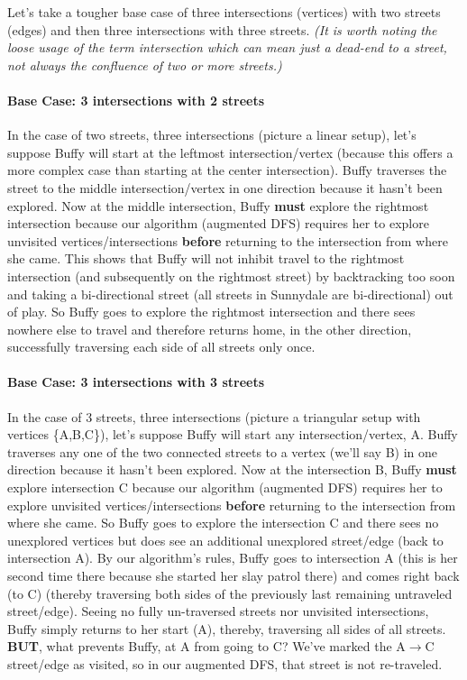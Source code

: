 \documentclass[conference]{styles/acmsiggraph}
\newcommand{\?}{\stackrel{?}{=}}
\newcommand\subsubsubsection{\paragraph}
\begin{document}
Let's take a tougher base case of three intersections (vertices) with two streets (edges) and then three intersections with three streets.  \textit{(It is worth noting the loose usage of the term intersection which can mean just a dead-end to a street, not always the confluence of two or more streets.)}  

\subsubsubsection{Base Case: 3 intersections with 2 streets} In the case of two streets, three intersections (picture a linear setup), let's suppose Buffy will start at the leftmost intersection/vertex (because this offers a more complex case than starting at the center intersection).  Buffy traverses the street to the middle intersection/vertex in one direction because it hasn't been explored.  Now at the middle intersection, Buffy \textbf{must} explore the rightmost intersection because our algorithm (augmented DFS) requires her to explore unvisited vertices/intersections \textbf{before} returning to the intersection from where she came.  This shows that Buffy will not inhibit travel to the rightmost intersection (and subsequently on the rightmost street) by backtracking too soon and taking a bi-directional street (all streets in Sunnydale are bi-directional) out of play.  So Buffy goes to explore the rightmost intersection and there sees nowhere else to travel and therefore returns home, in the other direction, successfully traversing each side of all streets only once.

\subsubsubsection{Base Case: 3 intersections with 3 streets} 
In the case of 3 streets, three intersections (picture a triangular setup with vertices \{A,B,C\}), let's suppose Buffy will start any intersection/vertex, A.  Buffy traverses any one of the two connected streets to a vertex (we'll say B) in one direction because it hasn't been explored.  Now at the intersection B, Buffy \textbf{must} explore intersection C because our algorithm (augmented DFS) requires her to explore unvisited vertices/intersections \textbf{before} returning to the intersection from where she came.  So Buffy goes to explore the intersection C and there sees no unexplored vertices but does see an additional unexplored street/edge (back to intersection A).  By our algorithm's rules, Buffy goes to intersection A (this is her second time there because she started her slay patrol there) and comes right back (to C) (thereby traversing both sides of the previously last remaining untraveled street/edge).  Seeing no fully un-traversed streets nor unvisited intersections, Buffy simply returns to her start (A), thereby, traversing all sides of all streets.  \textbf{BUT}, what prevents Buffy, at A from going to C?  We've marked the A$\to$C street/edge as visited, so in our augmented DFS, that street is not re-traveled.
\end{document}
